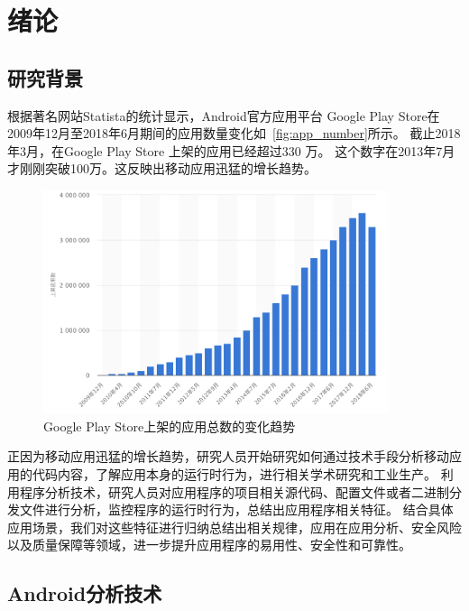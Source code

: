 \chapter {绪论}
\label{chp:intro}

\section{研究背景}

根据著名网站Statista的统计\cite{GoogleP55:online}显示，Android官方应用平台 Google Play Store在2009年12月至2018年6月期间的应用数量变化如~\autoref{fig:app_number}所示。
截止2018年3月，在Google Play Store 上架的应用已经超过330 万。
这个数字在2013年7月才刚刚突破100万。这反映出移动应用迅猛的增长趋势。

\begin{figure}[h]
	\centering
	\includegraphics[width=0.9\textwidth]{./Figures/app-numbers.png}
	\caption{Google Play Store上架的应用总数的变化趋势}
	\label{fig:app_number}
\end{figure}





正因为移动应用迅猛的增长趋势，研究人员开始研究如何通过技术手段分析移动应用的代码内容，了解应用本身的运行时行为，进行相关学术研究和工业生产。
利用程序分析技术，研究人员对应用程序的项目相关源代码、配置文件或者二进制分发文件进行分析，监控程序的运行时行为，总结出应用程序相关特征。
结合具体应用场景，我们对这些特征进行归纳总结出相关规律，应用在应用分析、安全风险以及质量保障等领域，进一步提升应用程序的易用性、安全性和可靠性。



\section{Android分析技术}

